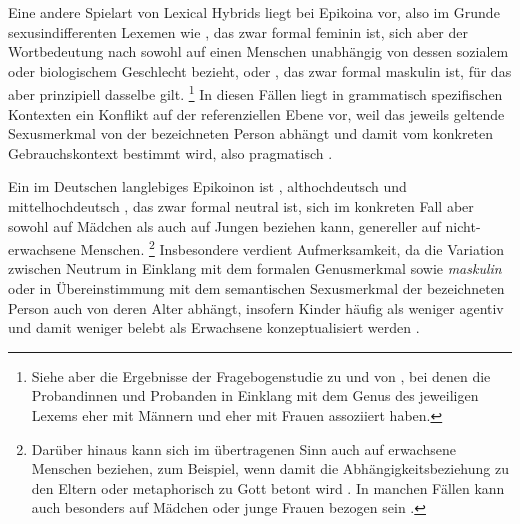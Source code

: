 \label{phsec:epikoina}
Eine andere Spielart von Lexical Hybrids liegt bei Epikoina vor, also im Grunde
sexus\-indifferenten Lexemen wie , das zwar formal feminin ist, sich
aber der Wortbedeutung nach sowohl auf einen Menschen unabhängig von dessen
sozialem oder biologischem Geschlecht bezieht, oder , das zwar
formal maskulin ist, für das aber prinzipiell dasselbe gilt.%
%
	\footnote{Siehe aber die Ergebnisse der Fragebogenstudie zu
		 und  von \citet[174--183]{klein2022}, bei denen
		die Probandinnen und Probanden in Einklang mit dem Genus des jeweiligen
		Lexems  eher mit Männern und  eher mit Frauen
		assoziiert haben.}
%
In diesen Fällen liegt in grammatisch spezifischen Kontexten ein Konflikt auf
der referenziellen Ebene vor, weil das jeweils geltende Sexusmerkmal von der
bezeichneten Person abhängt und damit vom konkreten Gebrauchskontext bestimmt
wird, also pragmatisch \autocite[142--144]{klein2022}.

Ein im Deutschen langlebiges Epikoinon ist ,
althochdeutsch  und
mittelhochdeutsch , das zwar formal neutral
ist, sich im konkreten Fall aber sowohl auf Mädchen als auch auf Jungen
beziehen kann, genereller auf nicht-erwachsene Menschen.%
%
	\footnote{Darüber hinaus kann sich  im übertragenen Sinn auch auf
		erwachsene Menschen beziehen, zum Beispiel, wenn damit die
		Abhängigkeitsbeziehung zu den Eltern oder metaphorisch zu Gott betont
		wird \autocite[s.\,v.~\textit{kint}]{lexer:mhdhwb}. In manchen Fällen
		kann  auch besonders auf Mädchen oder junge Frauen bezogen
		sein \autocites[808--816]{drw7}[s.\,v.~\textit{Kind}]{duden-online}.}
%
Insbesondere  verdient Aufmerksamkeit, da die Variation zwischen
Neutrum in Einklang mit dem formalen Genusmerkmal sowie \emph{maskulin} oder
 in Übereinstimmung mit dem semantischen Sexusmerkmal der
bezeichneten Person auch von deren Alter abhängt, insofern Kinder häufig als
weniger agentiv und damit weniger belebt als Erwachsene konzeptualisiert werden
\autocites[196]{comrie1989}[258--259]{birkenesfleischer2022}[151]{klein2022}.

